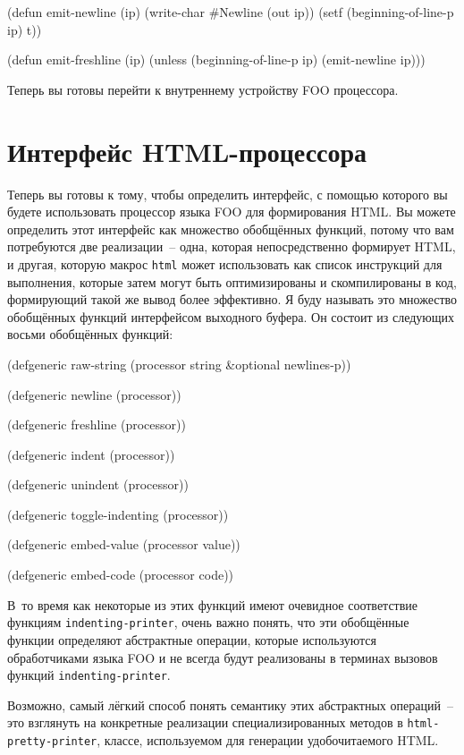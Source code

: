 \begin{myverb}
(defun emit-newline (ip)
  (write-char #\bslash{}Newline (out ip))
  (setf (beginning-of-line-p ip) t))

(defun emit-freshline (ip)
  (unless (beginning-of-line-p ip) (emit-newline ip)))
\end{myverb}

Теперь вы готовы перейти к внутреннему устройству FOO процессора. 

\section{Интерфейс HTML-процессора}

Теперь вы готовы к тому, чтобы определить интерфейс, с помощью которого вы будете
использовать процессор языка FOO для формирования HTML. Вы можете определить этот
интерфейс как множество обобщённых функций, потому что вам потребуются две реализации~--
одна, которая непосредственно формирует HTML, и другая, которую макрос \lstinline{html} может
использовать как список инструкций для выполнения, которые затем могут быть оптимизированы
и скомпилированы в код, формирующий такой же вывод более эффективно. Я буду называть это
множество обобщённых функций интерфейсом выходного буфера. Он состоит из следующих восьми
обобщённых функций:

\begin{myverb}
(defgeneric raw-string (processor string &optional newlines-p))

(defgeneric newline (processor))

(defgeneric freshline (processor))

(defgeneric indent (processor))

(defgeneric unindent (processor))

(defgeneric toggle-indenting (processor))

(defgeneric embed-value (processor value))

(defgeneric embed-code (processor code))
\end{myverb}

В~то время как некоторые из этих функций имеют очевидное соответствие функциям
\lstinline{indenting-printer}, очень важно понять, что эти обобщённые функции определяют
абстрактные операции, которые используются обработчиками языка FOO и не всегда будут
реализованы в терминах вызовов функций \lstinline{indenting-printer}.

Возможно, самый лёгкий способ понять семантику этих абстрактных операций~-- это взглянуть на
конкретные реализации специализированных методов в \lstinline{html-pretty-printer}, классе,
используемом для генерации удобочитаемого HTML.

